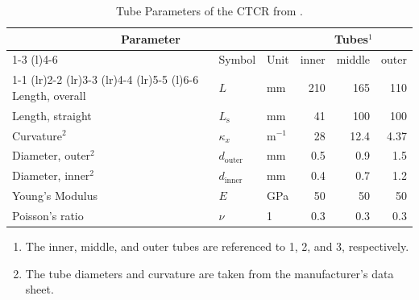{\begin{table}[thb!]
	\centering
	\caption{Tube Parameters of the CTCR from \cite{GrassmanChenLiangBurgner-Kahrs_IROS_2022}.}
	\label{tab:robot_parameters}
	\begin{tabular}{@{} lll r r r @{}}
		\toprule
		\multicolumn{3}{c}{Parameter}
		& \multicolumn{3}{c}{Tubes$^1$}\\
		\cmidrule(r){1-3}
		\cmidrule(l){4-6}
		\multicolumn{1}{c}{Term}
		& \multicolumn{1}{c}{Symbol}
		& \multicolumn{1}{c}{Unit}
		& \multicolumn{1}{c}{inner}
		& \multicolumn{1}{c}{middle}
		& \multicolumn{1}{c}{outer}\\
		\cmidrule(r){1-1}
		\cmidrule(lr){2-2}
		\cmidrule(lr){3-3}
		\cmidrule(lr){4-4}
		\cmidrule(lr){5-5}
		\cmidrule(l){6-6}
	    Length, overall		    & $L$				& \si{mm} 		& \num{210} 	&    \num{165} 	&     \num{110} 	\\
	    Length, straight	    & $L_\mathrm{s}$	& \si{mm} 		& \num{41} 	&    \num{100} 	&     \num{100} 		\\
	    Curvature$^2$ 			& $\kappa_x$		& \si{m}$^{-1}$ 	& \num{28} 	&    \num{12.4} &     \num{4.37}	\\
	    Diameter, outer$^2$		& $d_\text{outer}$	& \si{mm} 		& \num{0.5} 	&    \num{0.9} 	&     \num{1.5}		\\
	    Diameter, inner$^2$		& $d_\text{inner}$	& \si{mm} 		& \num{0.4} 	&    \num{0.7} 	&     \num{1.2}		\\
	    Young's Modulus		    & $E$				& \si{GPa} 		& \num{50} 		&    \num{50} 	&     \num{50} 		\\
	    Poisson's ratio		    & $\nu$				& \num{1} 		& \num{0,3} 	&    \num{0,3} 	&     \num{0,3}		\\
		\bottomrule
	\end{tabular}
	\hspace*{5mm}
	\begin{enumerate}
		\item[$^1$]\hspace{-2.5mm} The inner, middle, and outer tubes are referenced to 1, 2, and 3, respectively.
		\item[$^2$]\hspace{-2.5mm} The tube diameters and curvature are taken from the manufacturer's data sheet.
	\end{enumerate}
\end{table}
}



